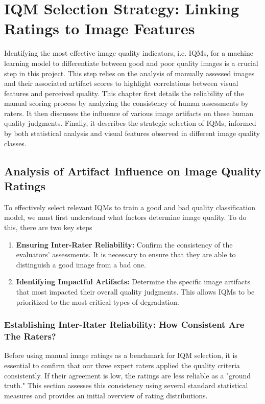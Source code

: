 \chapter{IQM Selection Strategy: Linking Ratings to Image Features}
\label{chap:iqm_selection_strategy}

Identifying the most effective image quality indicators, i.e. IQMs, for a machine learning model to differentiate between good and poor quality images is a crucial step in this project. This step relies on the analysis of manually assessed images and their associated artifact scores to highlight correlations between visual features and perceived quality. This chapter first details the reliability of the manual scoring process by analyzing the consistency of human assessments by raters. It then discusses the influence of various image artifacts on these human quality judgments. Finally, it describes the strategic selection of IQMs, informed by both statistical analysis and visual features observed in different image quality classes.

\section{Analysis of Artifact Influence on Image Quality Ratings}
\label{sec:analysis_artifact_influence}

To effectively select relevant IQMs to train a good and bad quality classification model, we must first understand what factors determine image quality. To do this, there are two key steps
\begin{enumerate}
    \item \textbf{Ensuring Inter-Rater Reliability:} Confirm the consistency of the evaluators' assessments. It is necessary to ensure that they are able to distinguish a good image from a bad one.
    \item \textbf{Identifying Impactful Artifacts:} Determine the specific image artifacts that most impacted their overall quality judgments. This allows IQMs to be prioritized to the most critical types of degradation.
\end{enumerate}

\subsection{Establishing Inter-Rater Reliability: How Consistent Are The Raters?}
\label{sec:inter_rater_reliability}

Before using manual image ratings as a benchmark for IQM selection, it is essential to confirm that our three expert raters applied the quality criteria consistently. If their agreement is low, the ratings are less reliable as a "ground truth." This section assesses this consistency using several standard statistical measures and provides an initial overview of rating distributions.


